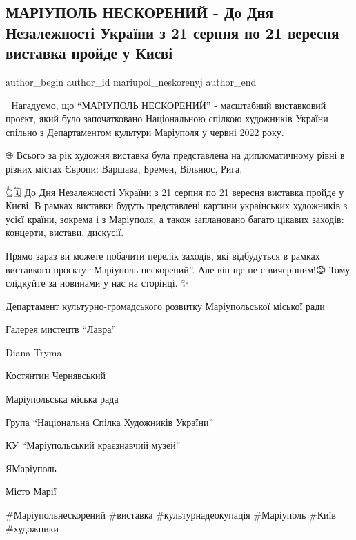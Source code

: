  
 
 
 
 

\subsection{МАРІУПОЛЬ НЕСКОРЕНИЙ - До Дня Незалежності України з 21 серпня по 21 вересня  виставка пройде у Києві}
\label{sec:18_08_2023.fb.mariupol_neskorenyj.2.mariupol_neskorenyj_vystavka_projde_v_kyevi}

\ifcmt
 author_begin
   author_id mariupol_neskorenyj
 author_end
\fi

📍 Нагадуємо, що \enquote{МАРІУПОЛЬ НЕСКОРЕНИЙ} - масштабний виставковий
проєкт,  який було започатковано Національною спілкою художників України
спільно з Департаментом культури Маріуполя у червні 2022 року. 

🌐 Всього за рік художня виставка була представлена на дипломатичному рівні в
різних містах Європи: Варшава, Бремен, Вільнюс, Рига. 

👆🗓 До Дня Незалежності України з 21 серпня по 21 вересня  виставка  пройде у
Києві. В рамках виставки будуть представлені картини українських художників з
усієї країни, зокрема і з Маріуполя, а також заплановано багато цікавих
заходів: концерти, вистави, дискусії.

Прямо зараз ви можете побачити перелік заходів, які відбудуться в рамках
виставкого проєкту \enquote{Маріуполь нескорений}.  Але він ще не є вичерпним!😊 Тому
слідкуйте за новинами у нас на сторінці. ✨️

Департамент культурно-громадського розвитку Маріупольської міської ради \par
Галерея мистецтв \enquote{Лавра} \par
Diana Tryma \par
Костянтин Чернявський \par
Маріупольська міська рада \par
Група \enquote{Національна Спілка Художників України} \par
КУ \enquote{Маріупольський краєзнавчий музей} \par
ЯМаріуполь \par
Місто Марії \par
\#Маріупольнескорений \#виставка \#культурнадеокупація \#Маріуполь \#Київ \#художники\par
